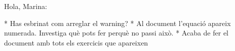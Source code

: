 Hola, Marina:

* Has esbrinat com arreglar el warning?
* Al document l'equació apareix numerada. Investiga què pots fer perquè no passi això.
* Acaba de fer el document amb tots els exercicis que apareixen